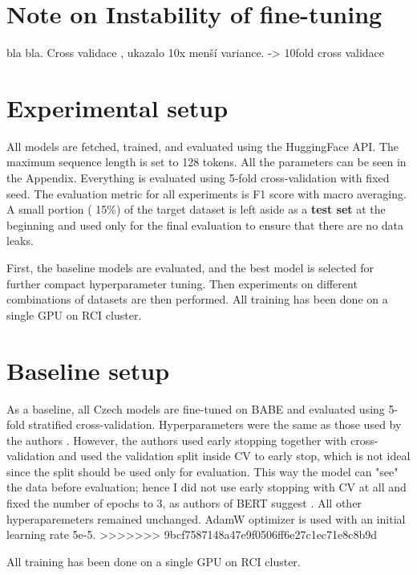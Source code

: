 \section{Note on Instability of fine-tuning}
bla bla. Cross validace , ukazalo 10x menší variance. -> 10fold cross validace



\section{Experimental setup}
All models are fetched, trained, and evaluated using the HuggingFace API. The maximum sequence length is set to 128 tokens. All the parameters can be seen in the Appendix.
Everything is evaluated using 5-fold cross-validation with fixed seed. The evaluation metric for all experiments is F1 score with macro averaging. A small portion ( 15\%) of the target dataset is left aside as a \textbf{test set} at the beginning and used only for the final evaluation to ensure that there are no data leaks.

First, the baseline models are evaluated, and the best model is selected for further compact hyperparameter tuning. Then experiments on different combinations of datasets are then performed.
All training has been done on a single GPU on RCI cluster.





 \section{Baseline setup}
 As a baseline, all Czech models are fine-tuned on BABE and evaluated using 5-fold stratified cross-validation. Hyperparameters were the same as those used by the authors \cite{Spinde2021MBIC}. However, the authors used early stopping together with cross-validation and used the validation split inside CV to early stop, which is not ideal since the split should be used only for evaluation. This way the model can "see" the data before evaluation; hence I did not use early stopping with CV at all and fixed the number of epochs to 3, as authors of BERT suggest \cite{devlin2019bert} . 
 All other hyperaparemeters remained unchanged. AdamW optimizer is used with an initial learning rate 5e-5. 
>>>>>>> 9bcf7587148a47e9f0506ff6e27c1ec71e8c8b9d
 
 
 
 
 
All training has been done on a single GPU on RCI cluster.

